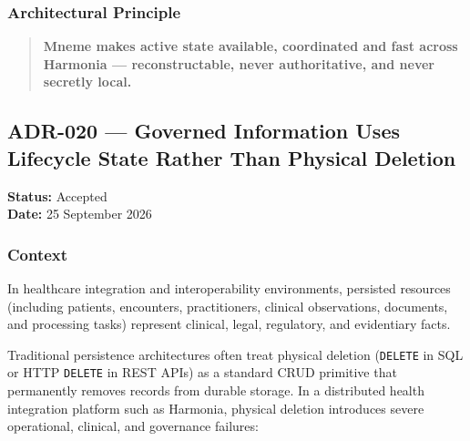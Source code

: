 \subsubsection{Architectural Principle}

\begin{quote}
    \textbf{Mneme makes active state available, coordinated and fast across Harmonia --- reconstructable, never authoritative, and never secretly local.}
\end{quote}


\subsection{ADR-020 --- Governed Information Uses Lifecycle State Rather Than Physical Deletion}
\label{adr:020-governed-information-lifecycle-state}

\textbf{Status:} Accepted\\
\textbf{Date:} 25 September 2026

\subsubsection{Context}

In healthcare integration and interoperability environments, persisted resources (including patients, encounters, practitioners, clinical observations, documents, and processing tasks) represent clinical, legal, regulatory, and evidentiary facts.

Traditional persistence architectures often treat physical deletion (\texttt{DELETE} in SQL or HTTP \texttt{DELETE} in REST APIs) as a standard CRUD primitive that permanently removes records from durable storage. In a distributed health integration platform such as Harmonia, physical deletion introduces severe operational, clinical, and governance failures:

